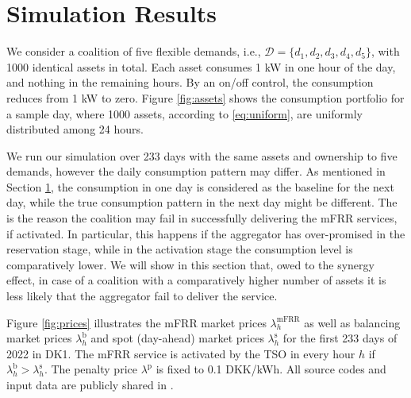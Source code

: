 \documentclass[conference]{IEEEtran}
\begin{document}
\section{Simulation Results}\label{chapter3}
%


We consider a coalition of five flexible demands, i.e., $\mathcal{D}=\{d_1, d_2, d_3, d_4, d_5\}$, with 1000 identical assets in total. Each asset  consumes 1 kW in one hour of the day, and nothing in the remaining hours. By an on/off control, the consumption  reduces from 1 kW to zero. Figure \ref{fig:assets} shows the  consumption portfolio for a sample day, where 1000 assets, according to \eqref{eq:uniform}, are uniformly distributed among 24 hours. 

We run our simulation over 233 days with the same assets and ownership to five demands, however the daily consumption pattern  may differ. As mentioned in Section \ref{chapter3}, the consumption in one day is considered as the baseline for the next day, while the true consumption pattern in the next day might be different. The is the reason the coalition may fail in successfully delivering the mFRR services, if activated. In particular, this happens if the aggregator has over-promised in the reservation stage, while in the activation stage the consumption level is comparatively lower. We will show in this section that, owed to the synergy effect, in case of a coalition with a comparatively higher number of assets it is less likely that the aggregator fail to deliver the service.   

Figure \ref{fig:prices}  illustrates the mFRR market prices $\lambda^{\text{mFRR}}_h$ as well as balancing market prices $\lambda^{\text{b}}_h$ and spot (day-ahead) market prices $\lambda^{\text{s}}_h$ for the first 233 days of 2022 in DK1. The mFRR service is activated by the TSO in every hour $h$ if $\lambda^{\text{b}}_h > \lambda^{\text{s}}_h$. 
The penalty price $\lambda^{\text{p}}$ is fixed to 0.1 DKK/kWh. All source codes and input data are
publicly shared in \cite{code}.
\end{document}
